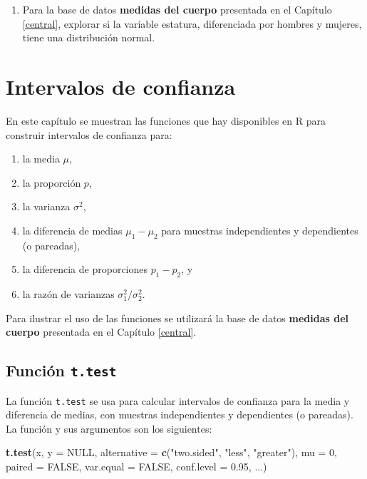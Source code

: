 \documentclass[10pt,]{krantz}
\makeatletter
\newenvironment{Shaded}{\begin{snugshade}}{\end{snugshade}}
\newcommand{\KeywordTok}[1]{\textcolor[rgb]{0.13,0.29,0.53}{\textbf{#1}}}
\newcommand{\DataTypeTok}[1]{\textcolor[rgb]{0.13,0.29,0.53}{#1}}
\newcommand{\DecValTok}[1]{\textcolor[rgb]{0.00,0.00,0.81}{#1}}
\newcommand{\FloatTok}[1]{\textcolor[rgb]{0.00,0.00,0.81}{#1}}
\newcommand{\StringTok}[1]{\textcolor[rgb]{0.31,0.60,0.02}{#1}}
\newcommand{\OtherTok}[1]{\textcolor[rgb]{0.56,0.35,0.01}{#1}}
\newcommand{\NormalTok}[1]{#1}
\providecommand{\tightlist}{%
  \setlength{\itemsep}{0pt}\setlength{\parskip}{0pt}}
\newenvironment{kframe}{%
\medskip{}
\setlength{\fboxsep}{.8em}
 \def\at@end@of@kframe{}%
 \ifinner\ifhmode%
  \def\at@end@of@kframe{\end{minipage}}%
  \begin{minipage}{\columnwidth}%
 \fi\fi%
 \def\FrameCommand##1{\hskip\@totalleftmargin \hskip-\fboxsep
 \colorbox{shadecolor}{##1}\hskip-\fboxsep
     \hskip-\linewidth \hskip-\@totalleftmargin \hskip\columnwidth}%
 \MakeFramed {\advance\hsize-\width
   \@totalleftmargin\z@ \linewidth\hsize
   \@setminipage}}%
 {\par\unskip\endMakeFramed%
 \at@end@of@kframe}
\renewenvironment{Shaded}{\begin{kframe}}{\end{kframe}}
\makeatother
\begin{document}
\begin{enumerate}
\def\labelenumi{\arabic{enumi}.}
\tightlist
\item
  Para la base de datos \textbf{medidas del cuerpo} presentada en el
  Capítulo \ref{central}, explorar si la variable estatura, diferenciada
  por hombres y mujeres, tiene una distribución normal.
\end{enumerate}

\chapter{Intervalos de confianza}\label{ic}

En este capítulo se muestran las funciones que hay disponibles en R para
construir intervalos de confianza para:

\begin{enumerate}
\def\labelenumi{\arabic{enumi}.}
\tightlist
\item
  la media \(\mu\),
\item
  la proporción \(p\),
\item
  la varianza \(\sigma^2\),
\item
  la diferencia de medias \(\mu_1-\mu_2\) para muestras independientes y
  dependientes (o pareadas),
\item
  la diferencia de proporciones \(p_1 - p_2\), y
\item
  la razón de varianzas \(\sigma_1^2 / \sigma_2^2\).
\end{enumerate}

Para ilustrar el uso de las funciones se utilizará la base de datos
\textbf{medidas del cuerpo} presentada en el Capítulo \ref{central}.

\section{\texorpdfstring{Función
\texttt{t.test}}{Función t.test}}\label{funcion-t.test}

La función \texttt{t.test} se usa para calcular intervalos de confianza
para la media y diferencia de medias, con muestras independientes y
dependientes (o pareadas). La función y sus argumentos son los
siguientes:

\begin{Shaded}
\begin{Highlighting}[]
\KeywordTok{t.test}\NormalTok{(x, }\DataTypeTok{y =} \OtherTok{NULL}\NormalTok{,}
       \DataTypeTok{alternative =} \KeywordTok{c}\NormalTok{(}\StringTok{"two.sided"}\NormalTok{, }\StringTok{"less"}\NormalTok{, }\StringTok{"greater"}\NormalTok{),}
       \DataTypeTok{mu =} \DecValTok{0}\NormalTok{, }\DataTypeTok{paired =} \OtherTok{FALSE}\NormalTok{, }\DataTypeTok{var.equal =} \OtherTok{FALSE}\NormalTok{,}
       \DataTypeTok{conf.level =} \FloatTok{0.95}\NormalTok{, ...)}
\end{Highlighting}
\end{Shaded}
\end{document}
